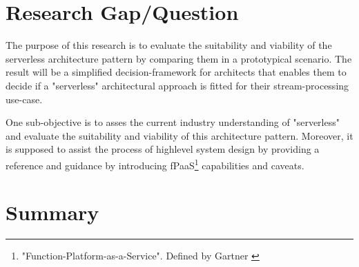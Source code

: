 \section{Research Gap/Question}


The purpose of this research is to evaluate the suitability and viability of the serverless architecture pattern by comparing them in a prototypical scenario. The result will be a simplified decision-framework for architects that enables them to decide if a "serverless" architectural approach is fitted for their stream-processing use-case.

One sub-objective is to asses the current industry understanding of "serverless" and evaluate the suitability and viability of this architecture pattern.
Moreover, it is supposed to assist the process of highlevel system design by providing a reference and guidance by introducing fPaaS\footnote{"Function-Platform-as-a-Service". Defined by Gartner \autocite{Chandrasekaran2017EvolutionWhen}} capabilities and caveats.

\section{Summary}

